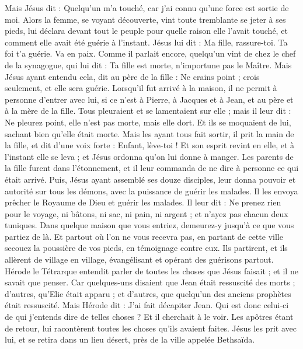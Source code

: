 \begin{multicols}{2}
Mais Jésus dit : Quelqu’un m'a touché, car j'ai connu qu'une force est sortie de moi.
Alors la femme, se voyant découverte, vint toute tremblante se jeter à ses pieds, lui déclara devant tout le peuple pour quelle raison elle l'avait touché, et comment elle avait été guérie à l’instant.
Jésus lui dit : Ma fille, rassure-toi. Ta foi t'a guérie. Va en paix.
Comme il parlait encore, quelqu'un vint de chez le chef de la synagogue, qui lui dit : Ta fille est morte, n’importune pas le Maître.
Mais Jésus ayant entendu cela, dit au père de la fille : Ne crains point ; crois seulement, et elle sera guérie.
Lorsqu’il fut arrivé à la maison, il ne permit à personne d’entrer avec lui, si ce n’est à Pierre, à Jacques et à Jean, et au père et à la mère de la fille.
Tous pleuraient et se lamentaient sur elle ; mais il leur dit : Ne pleurez point, elle n'est pas morte, mais elle dort.
Et ils se moquaient de lui, sachant bien qu'elle était morte.
Mais les ayant tous fait sortir, il prit la main de la fille, et dit d’une voix forte : Enfant, lève-toi !
Et son esprit revint en elle, et à l’instant elle se leva ; et Jésus ordonna qu'on lui donne à manger.
Les parents de la fille furent dans l’étonnement, et il leur commanda de ne dire à personne ce qui était arrivé.
\VerseOne{}Puis, Jésus ayant assemblé ses douze disciples, leur donna pouvoir et autorité sur tous les démons, avec la puissance de guérir les malades.
Il les envoya prêcher le Royaume de Dieu et guérir les malades.
Il leur dit : Ne prenez rien pour le voyage, ni bâtons, ni sac, ni pain, ni argent ; et n'ayez pas chacun deux tuniques.
Dans quelque maison que vous entriez, demeurez-y jusqu'à ce que vous partiez de là.
Et partout où l'on ne vous recevra pas, en partant de cette ville secouez la poussière de vos pieds, en témoignage contre eux.
Ils partirent, et ils allèrent de village en village, évangélisant et opérant des guérisons partout.
Hérode le Tétrarque entendit parler de toutes les choses que Jésus faisait ; et il ne savait que penser. Car quelques-uns disaient que Jean était ressuscité des morts ;
d’autres, qu'Elie était apparu ; et d'autres, que quelqu'un des anciens prophètes était ressuscité.
Mais Hérode dit : J'ai fait décapiter Jean. Qui est donc celui-ci de qui j'entends dire de telles choses ? Et il cherchait à le voir.
Les apôtres étant de retour, lui racontèrent toutes les choses qu'ils avaient faites. Jésus les prit avec lui, et se retira dans un lieu désert, près de la ville appelée Bethsaïda.

\end{multicols}
